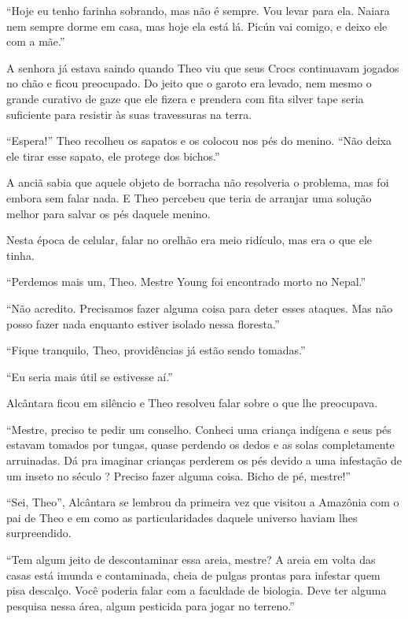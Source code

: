 ``Hoje eu tenho farinha sobrando, mas não é sempre. Vou levar para ela.
Naiara nem sempre dorme em casa, mas hoje ela está lá. Picún vai comigo,
e deixo ele com a mãe.''

A senhora já estava saindo quando Theo viu que seus Crocs continuavam
jogados no chão e ficou preocupado. Do jeito que o garoto era levado,
nem mesmo o grande curativo de gaze que ele fizera e prendera com fita
silver tape seria suficiente para resistir às suas travessuras na terra.

``Espera!'' Theo recolheu os sapatos e os colocou nos pés do menino.
``Não deixa ele tirar esse sapato, ele protege dos bichos.''

A anciã sabia que aquele objeto de borracha não resolveria o problema,
mas foi embora sem falar nada. E Theo percebeu que teria de arranjar uma
solução melhor para salvar os pés daquele menino.

\asterisc


Nesta época de celular, falar no orelhão era meio ridículo, mas era o
que ele tinha.

``Perdemos mais um, Theo. Mestre Young foi encontrado morto no Nepal.''

``Não acredito. Precisamos fazer alguma coisa para deter esses ataques.
Mas não posso fazer nada enquanto estiver isolado nessa floresta.''

``Fique tranquilo, Theo, providências já estão sendo tomadas.''

``Eu seria mais útil se estivesse aí.''

Alcântara ficou em silêncio e Theo resolveu falar sobre o que lhe
preocupava.

``Mestre, preciso te pedir um conselho. Conheci uma criança indígena e
seus pés estavam tomados por tungas, quase perdendo os dedos e as solas
completamente arruinadas. Dá pra imaginar crianças perderem os pés
devido a uma infestação de um inseto no século ? Preciso fazer
alguma coisa. Bicho de pé, mestre!''

``Sei, Theo'', Alcântara se lembrou da primeira vez que visitou a
Amazônia com o pai de Theo e em como as particularidades daquele
universo haviam lhes surpreendido.

``Tem algum jeito de descontaminar essa areia, mestre? A areia em volta
das casas está imunda e contaminada, cheia de pulgas prontas para
infestar quem pisa descalço. Você poderia falar com a faculdade de
biologia. Deve ter alguma pesquisa nessa área, algum pesticida para
jogar no terreno.''

